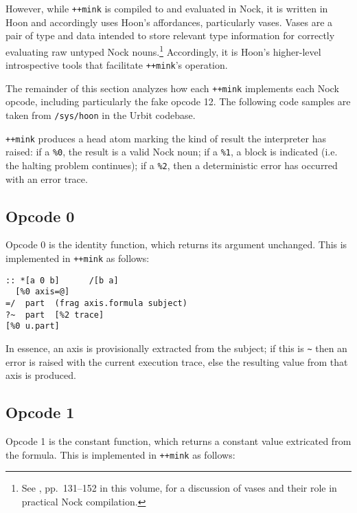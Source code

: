 \documentclass[twoside]{article}
\begin{document}
However, while \lstinline[style=inlinecode]{++mink} is compiled to and evaluated in Nock, it is written in Hoon and accordingly uses Hoon's affordances, particularly vases.  Vases are a pair of type and data intended to store relevant type information for correctly evaluating raw untyped Nock nouns.\footnote{See , pp.~131–152 in this volume, for a discussion of vases and their role in practical Nock compilation.}  Accordingly, it is Hoon's higher-level introspective tools that facilitate \lstinline[style=inlinecode]{++mink}'s operation.

The remainder of this section analyzes how each \lstinline[style=inlinecode]{++mink} implements each Nock opcode, including particularly the fake opcode 12.  The following code samples are taken from \lstinline[style=inlinecode]{/sys/hoon} in the Urbit codebase.

\lstinline[style=inlinecode]{++mink} produces a head atom marking the kind of result the interpreter has raised:  if a \lstinline[style=inlinecode]{%0}, the result is a valid Nock noun; if a \lstinline[style=inlinecode]{%1}, a block is indicated (i.e. the halting problem continues); if a \lstinline[style=inlinecode]{%2}, then a deterministic error has occurred with an error trace.

\subsection{Opcode 0}

Opcode 0 is the identity function, which returns its argument unchanged.  This is implemented in \lstinline[style=inlinecode]{++mink} as follows:

\begin{lstlisting}[style=listingcode]
:: *[a 0 b]      /[b a]
  [%0 axis=@]
=/  part  (frag axis.formula subject)
?~  part  [%2 trace]
[%0 u.part]
\end{lstlisting}

\noindent
In essence, an axis is provisionally extracted from the subject; if this is \texttt{\textasciitilde} then an error is raised with the current execution trace, else the resulting value from that axis is produced.

\subsection{Opcode 1}

Opcode 1 is the constant function, which returns a constant value extricated from the formula.  This is implemented in \lstinline[style=inlinecode]{++mink} as follows:
\end{document}
